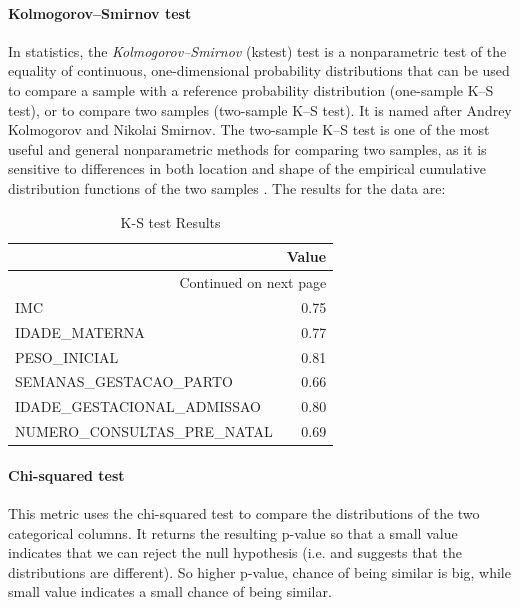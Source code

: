 \documentclass{article}
\begin{document}
\paragraph{Kolmogorov–Smirnov test}
In statistics, the \textit{Kolmogorov–Smirnov} (\acrshort{kstest}) test is a nonparametric test of the equality of continuous, one-dimensional probability distributions that can be used to compare a sample with a reference probability distribution (one-sample K–S test), or to compare two samples (two-sample K–S test). It is named after Andrey Kolmogorov and Nikolai Smirnov. 
The two-sample K–S test is one of the most useful and general nonparametric methods for comparing two samples, as it is sensitive to differences in both location and shape of the empirical cumulative distribution functions of the two samples \cite{kstest_wiki}.  The results for the data are:\\

\begin{longtable}{lr}
\caption{K-S test Results}\label{tab:ks}\\
\toprule
{} & Value \\
\midrule
\endhead
\midrule
\multicolumn{2}{r}{{Continued on next page}} \\
\midrule
\endfoot

\bottomrule
\endlastfoot
IMC                        &  0.75 \\
IDADE\_MATERNA              &  0.77 \\
PESO\_INICIAL               &  0.81 \\
SEMANAS\_GESTACAO\_PARTO     &  0.66 \\
IDADE\_GESTACIONAL\_ADMISSAO &  0.80 \\
NUMERO\_CONSULTAS\_PRE\_NATAL &  0.69 \\
\end{longtable}



\paragraph{Chi-squared test}
This metric uses the chi-squared test to compare the distributions of the two categorical columns. It returns the resulting p-value so that a small value indicates that we can reject the null hypothesis (i.e. and suggests that the distributions are different). So higher p-value, chance of being similar is big, while small value indicates a small chance of being similar.\\
\end{document}

